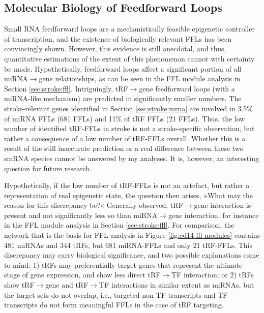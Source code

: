 


\subsection{Molecular Biology of Feedforward Loops}
Small RNA feedforward loops are a mechanistically feasible epigenetic controller of transcription,\cite{} and the existence of biologically relevant FFLs has been convincingly shown.\cite{} However, this evidence is still anecdotal, and thus, quantitative estimations of the extent of this phenomenon cannot with certainty be made. Hypothetically, feedforward loops affect a significant portion of all miRNA$\to$gene relationships, as can be seen in the FFL module analysis in Section \ref{sec:stroke:ffl}. Intriguingly, tRF$\to$gene feedforward loops (with a miRNA-like mechanism) are predicted in significantly smaller numbers. The stroke-relevant genes identified in Section \ref{sec:stroke:mrna} are involved in 3.5\% of miRNA FFLs (681 FFLs) and 11\% of tRF FFLs (21 FFLs). Thus, the low number of identified tRF-FFLs in stroke is not a stroke-specific observation, but rather a consequence of a low number of tRF-FFLs overall. Whether this is a result of the still inaccurate prediction or a real difference between these two smRNA species cannot be answered by my analyses. It is, however, an interesting question for future research. 

Hypothetically, if the low number of tRF-FFLs is not an artefact, but rather a representation of real epigenetic state, the question then arises, »What may the reason for this discrepancy be?« Generally observed, tRF$\to$gene interaction is present and not significantly less so than miRNA$\to$gene interaction, for instance in the FFL module analysis in Section \ref{sec:stroke:ffl}. For comparison, the network that is the basis for FFL analysis in Figure \ref{fig:cd14-ffl-modules} contains 481 miRNAs and 344 tRFs, but 681 miRNA-FFLs and only 21 tRF-FFLs. This discrepancy may carry biological significance, and two possible explanations come to mind: 1) tRFs may preferentially target genes that represent the ultimate stage of gene expression, and show less direct tRF$\to$TF interaction; or 2) tRFs show tRF$\to$gene and tRF$\to$TF interactions in similar extent as miRNAs, but the target sets do not overlap, i.e., targeted non-TF transcripts and TF transcripts do not form meaningful FFLs in the case of tRF targeting.

